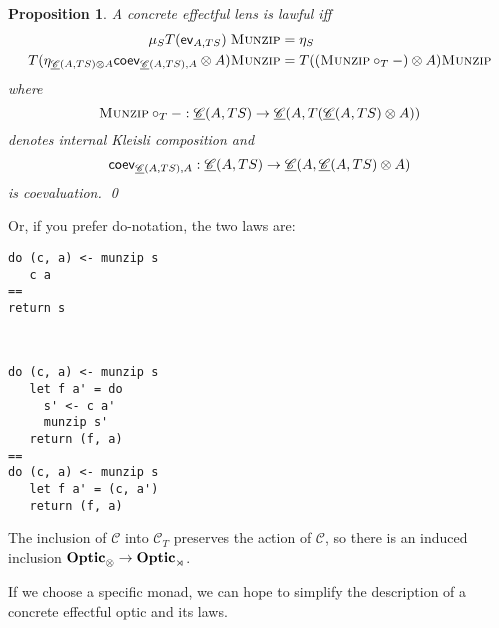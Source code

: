 \documentclass[11pt,letterpaper]{article}
\theoremstyle{plain}
\newtheorem{proposition}[theorem]{Proposition}
\theoremstyle{definition}
\newtheorem{definition}[theorem]{Definition}
\newcommand{\C}{\mathscr{C}}
\newcommand{\homC}{\underline{\C}}
\newcommand{\Optic}{\mathbf{Optic}}
\newcommand{\munzip}{\textsc{Munzip}}
\begin{document}
\begin{proposition}
A concrete effectful lens is lawful iff
  \begin{align*}
    \mu_S T(\ev_{A, TS}) \; \munzip &= \eta_S \\
    T(\eta_{\homC(A, TS) \otimes A}\coev_{\homC(A, TS), A} \otimes A)\munzip &= T((\munzip \circ_T -) \otimes A)\munzip
  \end{align*}
  where \[ \munzip \circ_T - : \homC(A, TS) \to \homC(A, T(\homC(A, TS) \otimes A)) \] denotes internal Kleisli composition and \[\coev_{\homC(A, TS), A} : \homC(A, TS) \to \homC(A, \homC(A, TS) \otimes A) \] is coevaluation. \qed
\end{proposition}
  Or, if you prefer do-notation, the two laws are:
\begin{multicols}{2}
\begin{verbatim}
do (c, a) <- munzip s
   c a
==
return s
\end{verbatim}
~\columnbreak
\begin{verbatim}
do (c, a) <- munzip s
   let f a' = do
     s' <- c a'
     munzip s'
   return (f, a)
==
do (c, a) <- munzip s
   let f a' = (c, a')
   return (f, a)
\end{verbatim}
\end{multicols}

The inclusion of $\C$ into $\C_T$ preserves the action of $\C$, so there is an induced inclusion $\Optic_\otimes \to \Optic_\monact$.

If we choose a specific monad, we can hope to simplify the description of a concrete effectful optic and its laws.

%
%
%
\end{document}
